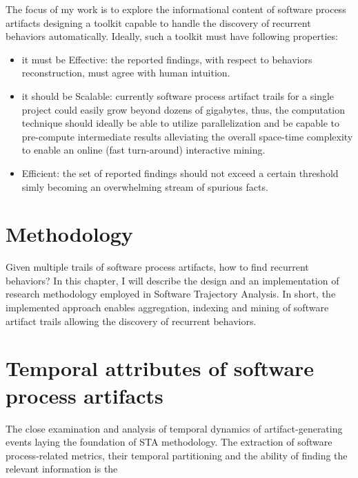 \documentclass[11pt,oneside]{article}
\numberwithin{equation}{subsection}
\begin{document}
The focus of my work is to explore the informational content of software process artifacts designing 
a toolkit capable to handle the discovery of recurrent behaviors automatically. Ideally, such a toolkit 
must have following properties:
\begin{itemize}
 \item it must be Effective: the reported findings, with respect to behaviors reconstruction, must agree 
 with human intuition.
 \item it should be Scalable: currently software process artifact trails for a single project could easily 
       grow beyond dozens of gigabytes, thus, the computation technique should ideally be able to utilize 
       parallelization and be capable to pre-compute intermediate results alleviating the overall space-time 
       complexity to enable an online (fast turn-around) interactive mining.
 \item Efficient: the set of reported findings should not exceed a certain threshold simly becoming an 
        overwhelming stream of spurious facts.
\end{itemize}


\section{Methodology}
Given multiple trails of software process artifacts, how to find recurrent behaviors? In this chapter, 
I will describe the design and an implementation of research methodology employed in Software Trajectory 
Analysis. In short, the implemented approach enables aggregation, indexing and mining of software 
artifact trails allowing the discovery of recurrent behaviors. 

\section{Temporal attributes of software process artifacts}
The close examination and analysis of temporal dynamics of artifact-generating events laying the foundation 
of STA methodology. The extraction of software process-related metrics, their temporal partitioning and the
ability of finding the relevant information is the 





%
%
\end{document}
